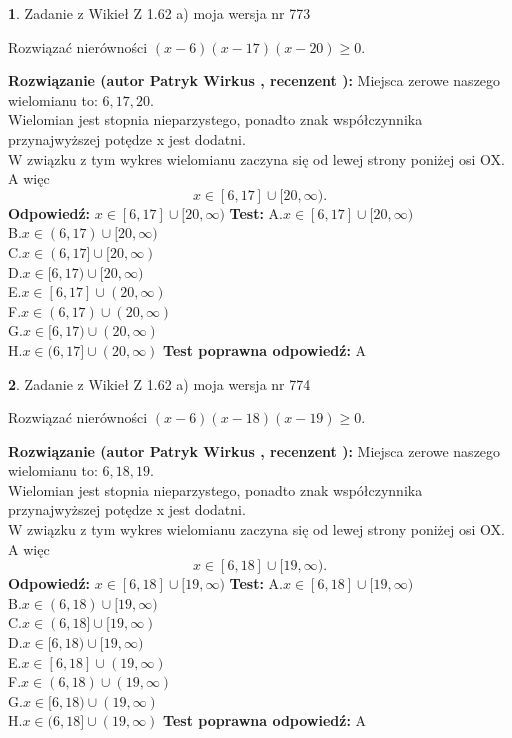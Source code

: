 \documentclass[12pt, a4paper]{article}
\theoremstyle{definition} %
\newtheorem{zad}{}
\newcommand{\zadStart}[1]{\begin{zad}#1\newline}
\newcommand{\zadStop}{\end{zad}}
\newcommand{\rozwStart}[2]{\noindent \textbf{Rozwiązanie (autor #1 , recenzent #2): }\newline}
\newcommand{\rozwStop}{\newline}
\newcommand{\odpStart}{\noindent \textbf{Odpowiedź:}\newline}
\newcommand{\odpStop}{\newline}
\newcommand{\testStart}{\noindent \textbf{Test:}\newline}
\newcommand{\testStop}{\newline}
\newcommand{\kluczStart}{\noindent \textbf{Test poprawna odpowiedź:}\newline}
\newcommand{\kluczStop}{\newline}
\begin{document}
\zadStart{Zadanie z Wikieł Z 1.62 a) moja wersja nr 773}

Rozwiązać nierówności $(x-6)(x-17)(x-20)\ge0$.
\zadStop
\rozwStart{Patryk Wirkus}{}
Miejsca zerowe naszego wielomianu to: $6, 17, 20$.\\
Wielomian jest stopnia nieparzystego, ponadto znak współczynnika przy\linebreak najwyższej potędze x jest dodatni.\\ W związku z tym wykres wielomianu zaczyna się od lewej strony poniżej osi OX. A więc $$x \in [6,17] \cup [20,\infty).$$
\rozwStop
\odpStart
$x \in [6,17] \cup [20,\infty)$
\odpStop
\testStart
A.$x \in [6,17] \cup [20,\infty)$\\
B.$x \in (6,17) \cup [20,\infty)$\\
C.$x \in (6,17] \cup [20,\infty)$\\
D.$x \in [6,17) \cup [20,\infty)$\\
E.$x \in [6,17] \cup (20,\infty)$\\
F.$x \in (6,17) \cup (20,\infty)$\\
G.$x \in [6,17) \cup (20,\infty)$\\
H.$x \in (6,17] \cup (20,\infty)$
\testStop
\kluczStart
A
\kluczStop



\zadStart{Zadanie z Wikieł Z 1.62 a) moja wersja nr 774}

Rozwiązać nierówności $(x-6)(x-18)(x-19)\ge0$.
\zadStop
\rozwStart{Patryk Wirkus}{}
Miejsca zerowe naszego wielomianu to: $6, 18, 19$.\\
Wielomian jest stopnia nieparzystego, ponadto znak współczynnika przy\linebreak najwyższej potędze x jest dodatni.\\ W związku z tym wykres wielomianu zaczyna się od lewej strony poniżej osi OX. A więc $$x \in [6,18] \cup [19,\infty).$$
\rozwStop
\odpStart
$x \in [6,18] \cup [19,\infty)$
\odpStop
\testStart
A.$x \in [6,18] \cup [19,\infty)$\\
B.$x \in (6,18) \cup [19,\infty)$\\
C.$x \in (6,18] \cup [19,\infty)$\\
D.$x \in [6,18) \cup [19,\infty)$\\
E.$x \in [6,18] \cup (19,\infty)$\\
F.$x \in (6,18) \cup (19,\infty)$\\
G.$x \in [6,18) \cup (19,\infty)$\\
H.$x \in (6,18] \cup (19,\infty)$
\testStop
\kluczStart
A
\kluczStop
\end{document}
